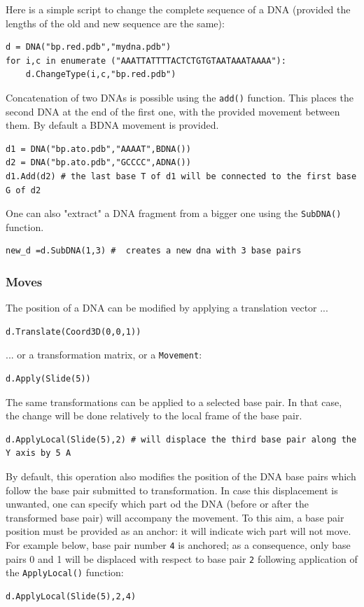 \documentclass[12pt,a4paper]{article}
\begin{document}
Here is a simple script to change the complete sequence of a DNA (provided the lengths of the old and new sequence are the same): 
\begin{verbatim}
d = DNA("bp.red.pdb","mydna.pdb")
for i,c in enumerate ("AAATTATTTTACTCTGTGTAATAAATAAAA"):
    d.ChangeType(i,c,"bp.red.pdb")
\end{verbatim} 

Concatenation of two DNAs is possible using the \texttt{add()} function.
This places the second DNA at the end of the first one, with the provided movement between them. By default a BDNA movement is provided.
\begin{verbatim}
d1 = DNA("bp.ato.pdb","AAAAT",BDNA())
d2 = DNA("bp.ato.pdb","GCCCC",ADNA())
d1.Add(d2) # the last base T of d1 will be connected to the first base G of d2
\end{verbatim}

One can also "extract" a DNA fragment from a bigger one using the \texttt{SubDNA()} function.
 
\begin{verbatim}
new_d =d.SubDNA(1,3) #  creates a new dna with 3 base pairs 
\end{verbatim}
 
\subsubsection{Moves}
The position of a DNA can be modified by applying a translation vector ...
\begin{verbatim}
d.Translate(Coord3D(0,0,1))
\end{verbatim}

... or a transformation matrix, or a {\tt Movement}:
\begin{verbatim}
d.Apply(Slide(5))
\end{verbatim}

The same transformations can be applied to a selected base pair. In that case, the change will be done relatively to the local frame of the base pair.
\begin{verbatim}
d.ApplyLocal(Slide(5),2) # will displace the third base pair along the Y axis by 5 A 
\end{verbatim}

By default, this operation also modifies the position of the DNA base pairs which follow the base pair submitted to transformation. In case this displacement is unwanted, one can specify which part od the DNA (before or after the transformed base pair) will accompany the movement. To this aim, a base pair position must be provided as an anchor: it will indicate wich part will not move. For example below, base pair number \texttt{4} is anchored; as a consequence, only base pairs 0 and 1 will be displaced with respect to base pair \texttt{2} following application of the \texttt{ApplyLocal()} function: 
\begin{verbatim}
d.ApplyLocal(Slide(5),2,4)
\end{verbatim}
\end{document}
